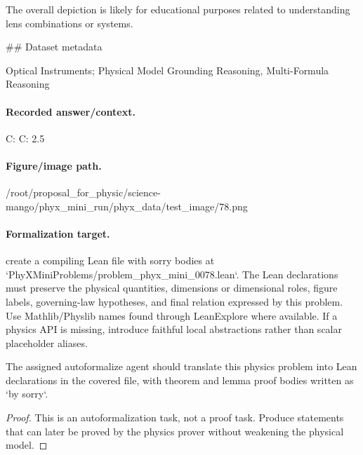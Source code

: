 The overall depiction is likely for educational purposes related to understanding lens combinations or systems.

\#\# Dataset metadata

Optical Instruments; Physical Model Grounding Reasoning, Multi-Formula Reasoning

\paragraph{Recorded answer/context.}
C: C: 2.5

\paragraph{Figure/image path.}
/root/proposal\_for\_physic/science-mango/phyx\_mini\_run/phyx\_data/test\_image/78.png

\paragraph{Formalization target.}
create a compiling Lean file with sorry bodies at `PhyXMiniProblems/problem\_phyx\_mini\_0078.lean`. The Lean declarations must preserve the physical quantities, dimensions or dimensional roles, figure labels, governing-law hypotheses, and final relation expressed by this problem.
Use Mathlib/Physlib names found through LeanExplore where available. If a physics API is missing, introduce faithful local abstractions rather than scalar placeholder aliases.

\begin{theorem}
\label{thm:physics:phyx_mini_0078:target}
The assigned autoformalize agent should translate this physics problem into Lean declarations in the covered file, with theorem and lemma proof bodies written as `by sorry`.
\end{theorem}
\begin{proof}
This is an autoformalization task, not a proof task. Produce statements that can later be proved by the physics prover without weakening the physical model.
\end{proof}

